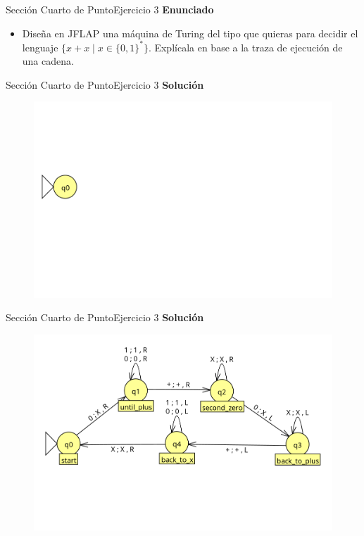 \documentclass[10pt, envcountsect, presentation, aspectratio=169]{beamer}
\begin{document}

\begin{frame}{Sección Cuarto de Punto}{Ejercicio 3}
\textbf{Enunciado}
	\begin{itemize}
        \item Diseña en JFLAP una máquina de Turing del tipo que quieras para decidir el lenguaje $\{x+x \mid x\in\{0,1\}^*\}$. Explícala en base a la traza de ejecución de una cadena.
	\end{itemize}
\end{frame}


\begin{frame}{Sección Cuarto de Punto}{Ejercicio 3}
    \textbf{Solución}\\
    \begin{figure}
        \includegraphics[scale=0.25]{images/mct1ej3_1.png}
    \end{figure}
\end{frame}


\begin{frame}{Sección Cuarto de Punto}{Ejercicio 3}
    \textbf{Solución}\\
    \begin{figure}
        \includegraphics[scale=0.25]{images/mct1ej3_2.png}
    \end{figure}
\end{frame}
\end{document}
